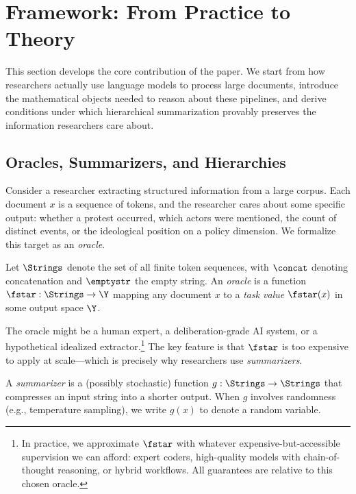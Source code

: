 \section{Framework: From Practice to Theory}\label{sec:overview}

This section develops the core contribution of the paper. We start from how researchers actually use language models to process large documents, introduce the mathematical objects needed to reason about these pipelines, and derive conditions under which hierarchical summarization provably preserves the information researchers care about.

\subsection{Oracles, Summarizers, and Hierarchies}\label{sec:practical-setup}

Consider a researcher extracting structured information from a large corpus. Each document $x$ is a sequence of tokens, and the researcher cares about some specific output: whether a protest occurred, which actors were mentioned, the count of distinct events, or the ideological position on a policy dimension. We formalize this target as an \emph{oracle}.

\begin{definition}[Oracle]\label{def:oracle}
Let $\Strings$ denote the set of all finite token sequences, with $\concat$ denoting concatenation and $\emptystr$ the empty string. An \emph{oracle} is a function $\fstar: \Strings \to \Y$ mapping any document $x$ to a \emph{task value} $\fstar(x)$ in some output space $\Y$.
\end{definition}

The oracle might be a human expert, a deliberation-grade AI system, or a hypothetical idealized extractor.\footnote{In practice, we approximate $\fstar$ with whatever expensive-but-accessible supervision we can afford: expert coders, high-quality models with chain-of-thought reasoning, or hybrid workflows. All guarantees are relative to this chosen oracle.} The key feature is that $\fstar$ is too expensive to apply at scale---which is precisely why researchers use \emph{summarizers}.

\begin{definition}[Summarizer]\label{def:summarizer}
A \emph{summarizer} is a (possibly stochastic) function $g: \Strings \to \Strings$ that compresses an input string into a shorter output. When $g$ involves randomness (e.g., temperature sampling), we write $g(x)$ to denote a random variable.
\end{definition}

